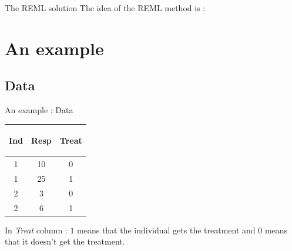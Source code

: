 \documentclass[unknownkeysallowed]{beamer}
\begin{document}
\begin{frame}{The REML solution}
\vspace{1cm}
    The idea of the REML method is : \newline
    \newline
	 \newline
	 \newline
	 \newline
	 \newline
\end{frame}

\section{An example}
\label{sec:example}

\subsection{Data}
\label{sub:Data}

\begin{frame}{An example : Data}
    \begin{table}
        \centering
        \begin{tabular}{| c | c | c|}
        \hline
        \begin{bf} Ind \end{bf} &
        \begin{bf} Resp \end{bf} &
        \begin{bf} Treat \end{bf} \\
        \hline
        1 &  10 & 0\\
        1 & 25 & 1 \\
        2 & 3 & 0 \\
        2 &  6 & 1\\
        \hline
        \end{tabular}
    \end{table}
\vspace{1cm}
In \textit{Treat} column : $1$ means that the individual gets the treatment and $0$ means that it doesn't get the treatment.
\end{frame}
\end{document}
